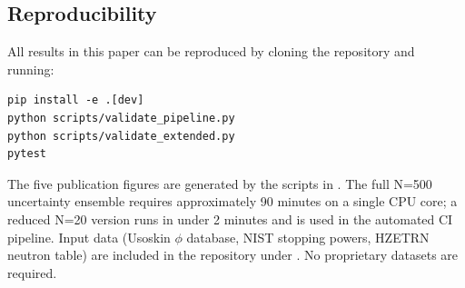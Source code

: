 \subsection{Reproducibility}
\label{sec:reproducibility}

All results in this paper can be reproduced by cloning the repository
and running:
\begin{verbatim}
pip install -e .[dev]
python scripts/validate_pipeline.py
python scripts/validate_extended.py
pytest
\end{verbatim}
The five publication figures are generated by the scripts in
.
The full N=500 uncertainty ensemble requires approximately 90 minutes
on a single CPU core; a reduced N=20 version runs in under 2 minutes
and is used in the automated CI pipeline.
Input data (Usoskin $\phi$ database, NIST stopping powers, HZETRN neutron table)
are included in the repository under .
No proprietary datasets are required.
